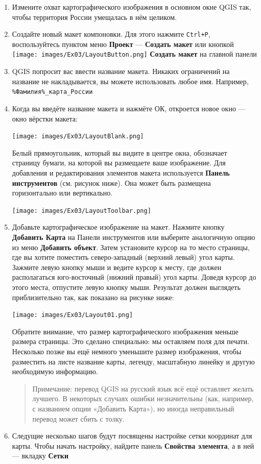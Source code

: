 \documentclass[
  12pt,
]{book}
\begin{document}
\begin{enumerate}
\def\labelenumi{\arabic{enumi}.}
\item
  Измените охват картографического изображения в основном окне QGIS так, чтобы территория России умещалась в нём целиком.
\item
  Создайте новый макет компоновки. Для этого нажмите \texttt{Ctrl+P}, воспользуйтесь пунктом меню \textbf{Проект} --- \textbf{Создать макет} или кнопкой \texttt{[image: images/Ex03/LayoutButton.png]} \textbf{Создать макет} на главной панели
\item
  QGIS попросит вас ввести название макета. Никаких ограничений на название не накладывается, вы можете использовать любое имя. Например, \texttt{\%Фамилия\%\_карта\_России}
\item
  Когда вы введёте название макета и нажмёте ОК, откроется новое окно --- окно вёрстки макета:

  \texttt{[image: images/Ex03/LayoutBlank.png]}

  Белый прямоугольник, который вы видите в центре окна, обозначает страницу бумаги, на которой вы размещаете ваше изображение. Для добавления и редактирования элементов макета используется \textbf{Панель инструментов} (см. рисунок ниже). Она может быть размещена горизонтально или вертикально.

  \texttt{[image: images/Ex03/LayoutToolbar.png]}
\item
  Добавьте картографическое изображение на макет. Нажмите кнопку \textbf{Добавить Карта} на Панели инструментов или выберите аналогичную опцию из меню \textbf{Добавить объект}. Затем установите курсор на то место страницы, где вы хотите поместить северо-западный (верхний левый) угол карты. Зажмите левую кнопку мыши и ведите курсор к месту, где должен располагаться юго-восточный (нижний правый) угол карты. Доведя курсор до этого места, отпустите левую кнопку мыши. Результат должен выглядеть приблизительно так, как показано на рисунке ниже:

  \texttt{[image: images/Ex03/Layout01.png]}

  Обратите внимание, что размер картографического изображения меньше размера страницы. Это сделано специально: мы оставляем поля для печати. Несколько позже вы ещё немного уменьшите размер изображения, чтобы разместить на листе название карты, легенду, масштабную линейку и другую необходимую информацию.

  \begin{quote}
  Примечание: перевод QGIS на русский язык всё ещё оставляет желать лучшего. В некоторых случаях ошибки незначительны (как, например, с названием опции «Добавить Карта»), но иногда неправильный перевод может сбить с толку.
  \end{quote}
\item
  Следущие несколько шагов будут посвящены настройке сетки координат для карты. Чтобы начать настройку, найдите панель \textbf{Свойства элемента}, а в ней --- вкладку \textbf{Сетки}


\end{enumerate}
\end{document}
